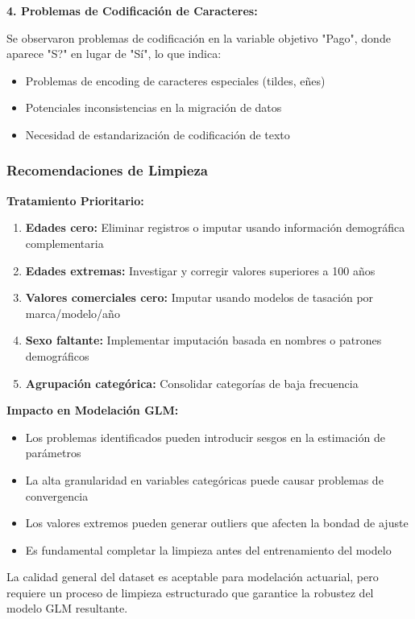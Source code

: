 \textbf{4. Problemas de Codificación de Caracteres:}

Se observaron problemas de codificación en la variable objetivo "Pago", donde aparece "S?" en lugar de "Sí", lo que indica:
\begin{itemize}
\item Problemas de encoding de caracteres especiales (tildes, eñes)
\item Potenciales inconsistencias en la migración de datos
\item Necesidad de estandarización de codificación de texto
\end{itemize}

\subsubsection{Recomendaciones de Limpieza}

\textbf{Tratamiento Prioritario:}
\begin{enumerate}
\item \textbf{Edades cero:} Eliminar registros o imputar usando información demográfica complementaria
\item \textbf{Edades extremas:} Investigar y corregir valores superiores a 100 años
\item \textbf{Valores comerciales cero:} Imputar usando modelos de tasación por marca/modelo/año
\item \textbf{Sexo faltante:} Implementar imputación basada en nombres o patrones demográficos
\item \textbf{Agrupación categórica:} Consolidar categorías de baja frecuencia
\end{enumerate}

\textbf{Impacto en Modelación GLM:}
\begin{itemize}
\item Los problemas identificados pueden introducir sesgos en la estimación de parámetros
\item La alta granularidad en variables categóricas puede causar problemas de convergencia
\item Los valores extremos pueden generar outliers que afecten la bondad de ajuste
\item Es fundamental completar la limpieza antes del entrenamiento del modelo
\end{itemize}

La calidad general del dataset es aceptable para modelación actuarial, pero requiere un proceso de limpieza estructurado que garantice la robustez del modelo GLM resultante.

